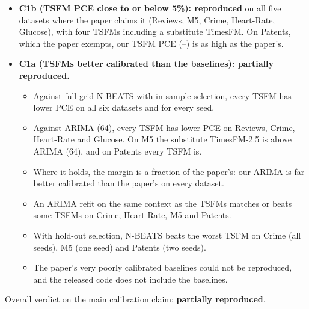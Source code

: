 \begin{itemize}
\item \textbf{C1b (TSFM PCE close to or below 5\%): reproduced} on all five datasets where the paper claims it
(Reviews, M5, Crime, Heart-Rate, Glucose), with four TSFMs including a substitute TimesFM. On Patents, which the
paper exempts, our TSFM PCE (\minTSFMpcePat--\maxTSFMpcePat) is as high as the paper's.
\item \textbf{C1a (TSFMs better calibrated than the baselines): partially reproduced.}
\begin{itemize}
\item Against full-grid N-BEATS with in-sample selection, every TSFM has lower PCE on all six datasets and for
every seed.
\item Against ARIMA (64), every TSFM has lower PCE on Reviews, Crime, Heart-Rate and Glucose. On M5 the
substitute TimesFM-2.5 is above ARIMA (64), and on Patents every TSFM is.
\item Where it holds, the margin is a fraction of the paper's: our ARIMA is far better calibrated than the
paper's on every dataset.
\item An ARIMA refit on the same context as the TSFMs matches or beats some TSFMs on Crime, Heart-Rate, M5 and
Patents.
\item With hold-out selection, N-BEATS beats the worst TSFM on Crime (all seeds), M5 (one seed) and Patents
(two seeds).
\item The paper's very poorly calibrated baselines could not be reproduced, and the released code does not
include the baselines.
\end{itemize}
\end{itemize}
Overall verdict on the main calibration claim: \textbf{partially reproduced}.

